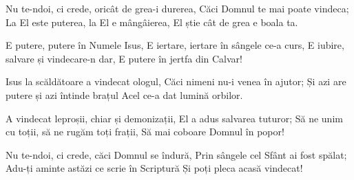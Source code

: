 \beginverse
Nu te-ndoi, ci crede, oricât de grea-i durerea,
Căci Domnul te mai poate vindeca;
La El este puterea, la El e mângâierea,
El știe cât de grea e boala ta.
\endverse

\beginchorus
E putere, putere în Numele Isus,
E iertare, iertare în sângele ce-a curs,
E iubire, salvare și vindecare-n dar,
E putere în jertfa din Calvar!
\endchorus

\beginverse
Isus la scăldătoare a vindecat ologul,
Căci nimeni nu-i venea în ajutor;
Și azi are putere și azi întinde brațul
Acel ce-a dat lumină orbilor.
\endverse

\beginverse
A vindecat leproșii, chiar și demonizații,
El a adus salvarea tuturor;
Să ne unim cu toții, să ne rugăm toți frații,
Să mai coboare Domnul în popor!
\endverse

\beginverse
Nu te-ndoi, ci crede, căci Domnul se îndură,
Prin sângele cel Sfânt ai fost spălat;
Adu-ți aminte astăzi ce scrie în Scriptură
Și poți pleca acasă vindecat!
\endverse
\endsong